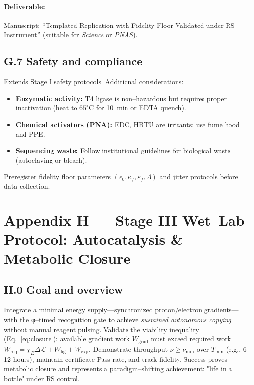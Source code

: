 \documentclass[11pt]{article}
\begin{document}
\paragraph{Deliverable:} Manuscript: ``Templated Replication with Fidelity Floor Validated under RS Instrument'' (suitable for \emph{Science} or \emph{PNAS}).

\subsection*{G.7 Safety and compliance}

Extends Stage I safety protocols. Additional considerations:
\begin{itemize}
\item \textbf{Enzymatic activity:} T4 ligase is non–hazardous but requires proper inactivation (heat to $65^\circ$C for 10~min or EDTA quench).
\item \textbf{Chemical activators (PNA):} EDC, HBTU are irritants; use fume hood and PPE.
\item \textbf{Sequencing waste:} Follow institutional guidelines for biological waste (autoclaving or bleach).
\end{itemize}
Preregister fidelity floor parameters $(\epsilon_0,\kappa_f,\varepsilon_f,\Lambda)$ and jitter protocols before data collection.


\section*{Appendix H — Stage III Wet–Lab Protocol: Autocatalysis \& Metabolic Closure}\label{app:stage3-protocol}

\subsection*{H.0 Goal and overview}
Integrate a minimal energy supply—synchronized proton/electron gradients—with the φ–timed recognition gate to achieve \emph{sustained autonomous copying} without manual reagent pulsing. Validate the viability inequality (Eq.~\ref{eq:closure}): available gradient work $W_{\mathrm{grad}}$ must exceed required work $W_{\mathrm{req}}=\chi_E\Delta\mathcal{L}+W_{\mathrm{lig}}+W_{\mathrm{exp}}$. Demonstrate throughput $\nu\ge\nu_{\min}$ over $T_{\min}$ (e.g., 6–12 hours), maintain certificate \textsf{Pass} rate, and track fidelity. Success proves metabolic closure and represents a paradigm–shifting achievement: "life in a bottle" under RS control.
\end{document}
